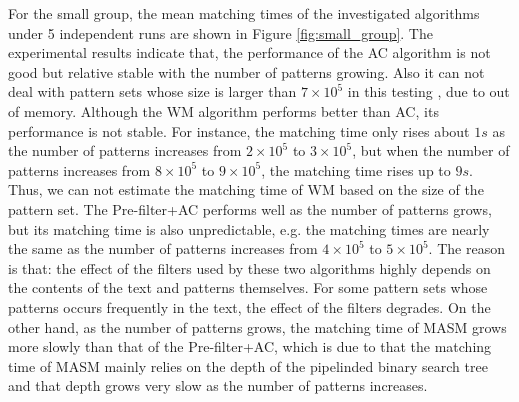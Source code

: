 For the small group, the mean matching times of the investigated
algorithms under 5 independent runs are shown in Figure
\ref{fig:small_group}. The experimental results indicate that, the
performance of the \textsf{AC} algorithm is not good but relative
stable with the number of patterns growing. Also it can not deal with
pattern sets whose size is larger than $7 \times 10^5$ in this testing
, due to out of memory. Although the \textsf{WM} algorithm performs
better than \textsf{AC}, its performance is not stable. For instance,
the matching time only rises about $1s$ as the number of patterns
increases from $2 \times 10^5$ to $3 \times 10^5$, but when the number
of patterns increases from $8 \times 10^5$ to $9 \times 10^5$, the
matching time rises up to $9s$. Thus, we can not estimate the matching
time of \textsf{WM} based on the size of the pattern set. The
\textsf{Pre-filter+AC} performs well as the number of patterns grows,
but its matching time is also unpredictable, e.g. the matching times
are nearly the same as the number of patterns increases from
$4 \times 10^5$ to $5 \times 10^5$. The reason is that: the effect of
the filters used by these two algorithms highly depends on the
contents of the text and patterns themselves. For some pattern sets
whose patterns occurs frequently in the text, the effect of the
filters degrades. On the other hand, as the number of patterns grows,
the matching time of \textsf{MASM} grows more slowly than that of the
\textsf{Pre-filter+AC}, which is due to that the matching time of
\textsf{MASM} mainly relies on the depth of the pipelinded binary
search tree and that depth grows very slow as the number of patterns
increases.

